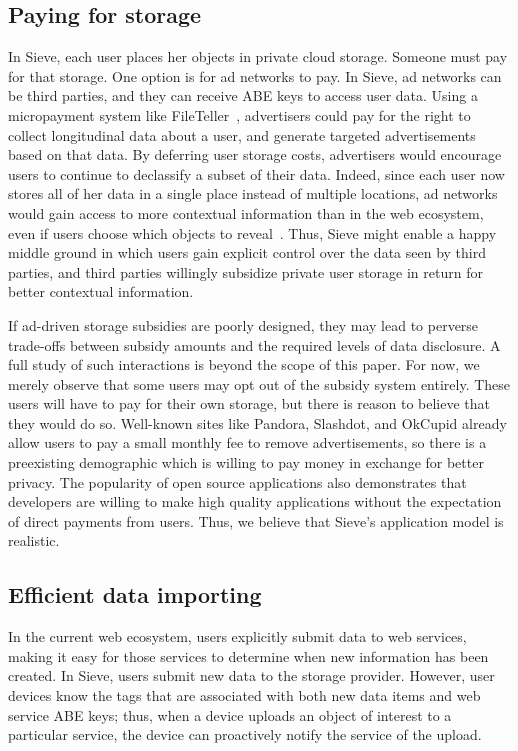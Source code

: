 \subsection{Paying for storage} 
In Sieve,
each user places her objects in private cloud
storage. Someone must pay for that storage.
One option is for ad networks to pay. In Sieve,
ad networks can be third parties, and they can
receive ABE keys to access user data. Using a
micropayment system like FileTeller~\cite{fileteller},
advertisers could pay for the right to collect
longitudinal data about a user, and generate
targeted advertisements based on that data.
By deferring user storage costs, advertisers
would encourage users to continue to declassify
a subset of their data. Indeed, since each user
now stores all of her data in a single place
instead of multiple locations, ad networks
would gain access to more contextual information
than in the web ecosystem, even if users choose
which objects to reveal~\cite{adnostic}. Thus,
Sieve might enable a happy middle ground in
which users gain explicit control over the data
seen by third parties, and third parties willingly
subsidize private user storage in return for
better contextual information.

If ad-driven storage subsidies are poorly
designed, they may lead to perverse trade-offs
between subsidy amounts and the required
levels of data disclosure. A full study of
such interactions is beyond the scope of
this paper. For now, we merely observe that
some users may opt out of the subsidy system
entirely. These users will have to pay for
their own storage, but there is reason to
believe that they would do so. Well-known
sites like Pandora, Slashdot, and OkCupid
already allow users to pay a small monthly
fee to remove advertisements, so there is a
preexisting demographic which is willing to
pay money in exchange for better privacy.
The popularity of open source applications
also demonstrates that developers are willing
to make high quality applications without the
expectation of direct payments from users.
Thus, we believe that Sieve's application
model is realistic.

\subsection{Efficient data importing} 
In the
current web ecosystem, users explicitly submit
data to web services, making it easy for those
services to determine when new information
has been created. In Sieve, users submit new
data to the storage provider. However, user
devices know the tags that are associated
with both new data items and web service ABE
keys; thus, when a device uploads an object
of interest to a particular service, the device
can proactively notify the service of the upload.

